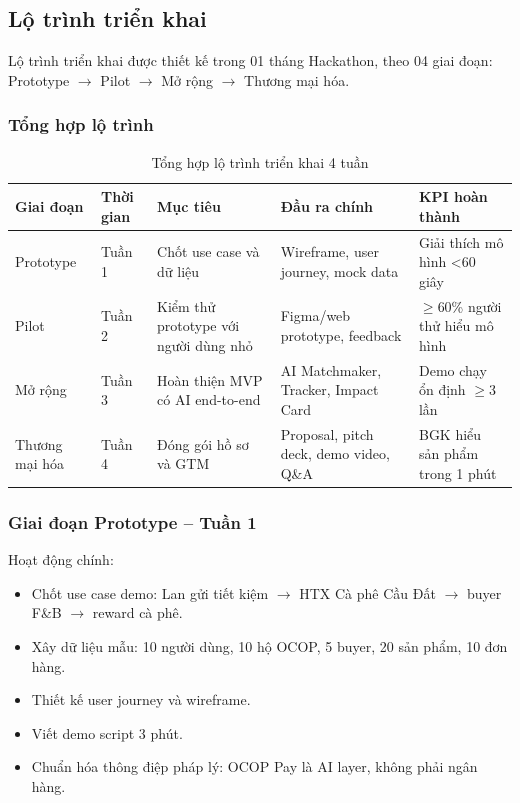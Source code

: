 \documentclass[13pt,a4paper]{extarticle}
\begin{document}
\subsection{Lộ trình triển khai}

Lộ trình triển khai được thiết kế trong 01 tháng Hackathon, theo 04 giai đoạn: Prototype $\rightarrow$ Pilot $\rightarrow$ Mở rộng $\rightarrow$ Thương mại hóa.

\subsubsection{Tổng hợp lộ trình}

\begin{table}[H]
\centering
\caption{Tổng hợp lộ trình triển khai 4 tuần}
\begin{tabular}{|p{2.5cm}|p{2cm}|p{4cm}|p{3cm}|p{2.5cm}|}
\hline
\textbf{Giai đoạn} & \textbf{Thời gian} & \textbf{Mục tiêu} & \textbf{Đầu ra chính} & \textbf{KPI hoàn thành} \\
\hline
Prototype & Tuần 1 & Chốt use case và dữ liệu & Wireframe, user journey, mock data & Giải thích mô hình <60 giây \\
\hline
Pilot & Tuần 2 & Kiểm thử prototype với người dùng nhỏ & Figma/web prototype, feedback & $\geq$60\% người thử hiểu mô hình \\
\hline
Mở rộng & Tuần 3 & Hoàn thiện MVP có AI end-to-end & AI Matchmaker, Tracker, Impact Card & Demo chạy ổn định $\geq$3 lần \\
\hline
Thương mại hóa & Tuần 4 & Đóng gói hồ sơ và GTM & Proposal, pitch deck, demo video, Q\&A & BGK hiểu sản phẩm trong 1 phút \\
\hline
\end{tabular}
\end{table}

\subsubsection{Giai đoạn Prototype -- Tuần 1}

Hoạt động chính:
\begin{itemize}
    \item Chốt use case demo: Lan gửi tiết kiệm $\rightarrow$ HTX Cà phê Cầu Đất $\rightarrow$ buyer F\&B $\rightarrow$ reward cà phê.
    \item Xây dữ liệu mẫu: 10 người dùng, 10 hộ OCOP, 5 buyer, 20 sản phẩm, 10 đơn hàng.
    \item Thiết kế user journey và wireframe.
    \item Viết demo script 3 phút.
    \item Chuẩn hóa thông điệp pháp lý: OCOP Pay là AI layer, không phải ngân hàng.
\end{itemize}
\end{document}
